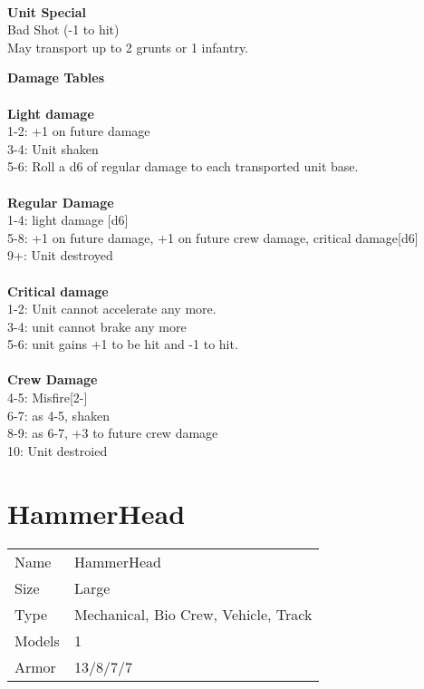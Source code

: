\ \\



{\bf Unit Special} \\
Bad Shot (-1 to hit) \\ May transport up to 2 grunts or 1 infantry. 

{\bf Damage Tables} \\
\ \\ {\bf Light damage } \\
1-2: +1 on future damage \\
3-4: Unit shaken \\
5-6: Roll a d6 of regular damage to each transported unit base. \\
\ \\ {\bf Regular Damage } \\
1-4: light damage [d6] \\
5-8: +1 on future damage, +1 on future crew damage, critical damage[d6] \\
9+: Unit destroyed \\
\ \\ {\bf Critical damage } \\
1-2: Unit cannot accelerate any more.  \\
3-4: unit cannot brake any more \\
5-6: unit gains +1 to be hit and -1 to hit. \\
\ \\ {\bf Crew Damage } \\
4-5: Misfire[2-] \\
6-7: as 4-5, shaken \\
8-9: as 6-7, +3 to future crew damage \\
10: Unit destroied \\










\pagebreak

\section{ HammerHead }

\begin{tabular}{ll}
  Name & HammerHead \\
  Size & Large\\
  Type & Mechanical, Bio Crew, Vehicle, Track\\
  Models & 1\\
  Armor & 13/8/7/7\\
\end{tabular}



